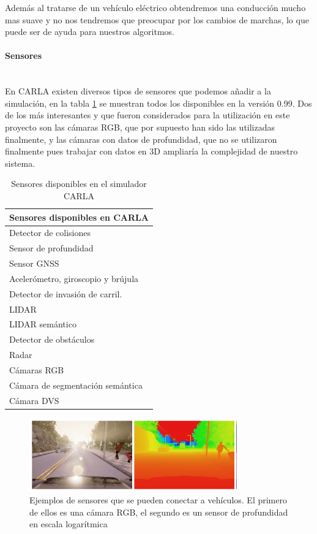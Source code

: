 Además al tratarse de un vehículo eléctrico obtendremos una conducción mucho mas suave y no nos tendremos que preocupar por los cambios de marchas, lo que puede ser de ayuda para nuestros algoritmos.


\paragraph{Sensores}\mbox{}\\
En CARLA existen diversos tipos de sensores que podemos añadir a la simulación, en la tabla \ref{tab:sensoresCarlaTabla} se muestran todos los disponibles en la versión 0.99. Dos de los más interesantes y que fueron considerados para la utilización en este proyecto son las cámaras RGB, que por supuesto han sido las utilizadas finalmente, y las cámaras con datos de profundidad, que no se utilizaron finalmente pues trabajar con datos en 3D ampliaría la complejidad de nuestro sistema.

\begin{table}[]
    \centering
    \begin{tabular}{@{}l@{}}
    \toprule
    Sensores disponibles en CARLA      \\ \midrule
    Detector de colisiones             \\
    Sensor de profundidad              \\
    Sensor GNSS                        \\
    Acelerómetro, giroscopio y brújula \\
    Detector de invasión de carril.    \\
    LIDAR                              \\
    LIDAR semántico                    \\
    Detector de obstáculos             \\
    Radar                              \\
    Cámaras RGB                        \\
    Cámara de segmentación semántica   \\
    Cámara DVS                         \\ \bottomrule
    \end{tabular}
    \caption{Sensores disponibles en el simulador CARLA}
    \label{tab:sensoresCarlaTabla}
\end{table}

\begin{figure}[h!]
    \centering
    \includegraphics[width=0.8\textwidth]{img/carla2.png}
    \caption[Ejemplos de sensores que se pueden conectar a vehículos]{Ejemplos de sensores que se pueden conectar a vehículos. El primero de ellos es una cámara RGB, el segundo es un sensor de profundidad en escala logarítmica}
\end{figure}


